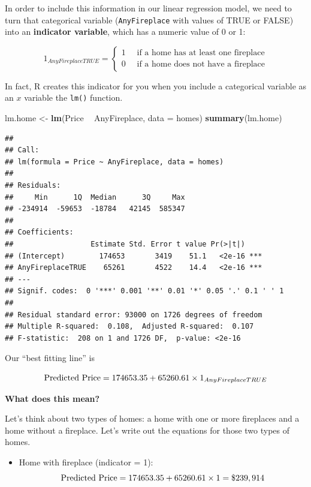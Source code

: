\documentclass[]{book}
\newenvironment{Shaded}{\begin{snugshade}}{\end{snugshade}}
\newcommand{\DataTypeTok}[1]{\textcolor[rgb]{0.13,0.29,0.53}{#1}}
\newcommand{\KeywordTok}[1]{\textcolor[rgb]{0.13,0.29,0.53}{\textbf{#1}}}
\newcommand{\NormalTok}[1]{#1}
\newcommand{\OperatorTok}[1]{\textcolor[rgb]{0.81,0.36,0.00}{\textbf{#1}}}
\newcommand{\StringTok}[1]{\textcolor[rgb]{0.31,0.60,0.02}{#1}}
\providecommand{\tightlist}{%
  \setlength{\itemsep}{0pt}\setlength{\parskip}{0pt}}
\begin{document}
In order to include this information in our linear regression model, we need to turn that categorical variable (\texttt{AnyFireplace} with values of TRUE or FALSE) into an \textbf{indicator variable}, which has a numeric value of 0 or 1:

\[ 1_{AnyFireplaceTRUE} = \begin{cases}1 \quad \text{ if a home has at least one fireplace}\\ 0\quad \text{ if a home does not have a fireplace} \end{cases}\]

In fact, R creates this indicator for you when you include a categorical variable as an \(x\) variable the \texttt{lm()} function.

\begin{Shaded}
\begin{Highlighting}[]
\NormalTok{lm.home <-}\StringTok{ }\KeywordTok{lm}\NormalTok{(Price }\OperatorTok{~}\StringTok{ }\NormalTok{AnyFireplace, }\DataTypeTok{data =}\NormalTok{ homes)}
\KeywordTok{summary}\NormalTok{(lm.home)}
\end{Highlighting}
\end{Shaded}

\begin{verbatim}
## 
## Call:
## lm(formula = Price ~ AnyFireplace, data = homes)
## 
## Residuals:
##     Min      1Q  Median      3Q     Max 
## -234914  -59653  -18784   42145  585347 
## 
## Coefficients:
##                  Estimate Std. Error t value Pr(>|t|)    
## (Intercept)        174653       3419    51.1   <2e-16 ***
## AnyFireplaceTRUE    65261       4522    14.4   <2e-16 ***
## ---
## Signif. codes:  0 '***' 0.001 '**' 0.01 '*' 0.05 '.' 0.1 ' ' 1
## 
## Residual standard error: 93000 on 1726 degrees of freedom
## Multiple R-squared:  0.108,  Adjusted R-squared:  0.107 
## F-statistic:  208 on 1 and 1726 DF,  p-value: <2e-16
\end{verbatim}

Our ``best fitting line'' is

\[ \hbox{Predicted Price} = 174653.35 + 65260.61 \times 1_{AnyFireplaceTRUE} \]

\textbf{What does this mean?}

Let's think about two types of homes: a home with one or more fireplaces and a home without a fireplace. Let's write out the equations for those two types of homes.

\begin{itemize}
\tightlist
\item
  Home with fireplace (indicator = 1):\\
  \[ \hbox{Predicted Price} = 174653.35 + 65260.61 \times 1 = \$ 239,914 \]
\end{itemize}
\end{document}
